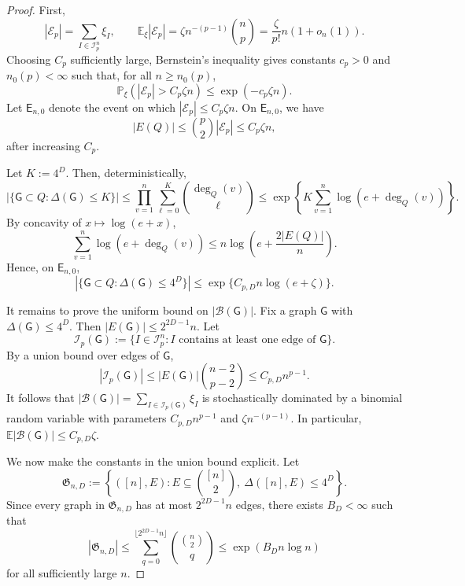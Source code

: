 \documentclass[12pt]{article}
\newcommand{\E}{\mathbb{E}}
\renewcommand{\P}{\mathbb{P}}
\newcommand{\mcB}{\mathcal{B}}
\newcommand{\mcE}{\mathcal{E}}
\newcommand{\mcI}{\mathcal{I}}
\begin{document}
\begin{proof}
First,
\[
    |\mcE_p|=\sum_{I\in\mcI_p^n}\xi_I,
    \qquad
    \E_\xi|\mcE_p|
    =
    \zeta n^{-(p-1)}\binom np
    =
    \frac{\zeta}{p!}n(1+o_n(1)).
\]
Choosing \(C_p\) sufficiently large, Bernstein's inequality gives
constants \(c_p>0\) and \(n_0(p)<\infty\) such that, for all
\(n\ge n_0(p)\),
\[
    \P_\xi\left(|\mcE_p|>C_p\zeta n\right)
    \le
    \exp(-c_p\zeta n).
\]
Let \(\mathsf E_{n,0}\) denote the event on which
\(|\mcE_p|\le C_p\zeta n\). On \(\mathsf E_{n,0}\), we have
\[
    |E(Q)|
    \le
    \binom p2|\mcE_p|
    \le
    C_p\zeta n,
\]
after increasing \(C_p\).

Let \(K:=4^D\). Then, deterministically,
\[
    |\{\mathsf G\subset Q:\Delta(\mathsf G)\le K\}|
    \le
    \prod_{v=1}^n
    \sum_{\ell=0}^K\binom{\deg_Q(v)}{\ell}
    \le
    \exp\left\{
        K\sum_{v=1}^n\log(e+\deg_Q(v))
    \right\}.
\]
By concavity of \(x\mapsto\log(e+x)\),
\[
    \sum_{v=1}^n\log(e+\deg_Q(v))
    \le
    n\log\left(
        e+\frac{2|E(Q)|}{n}
    \right).
\]
Hence, on \(\mathsf E_{n,0}\),
\[
    |\{\mathsf G\subset Q:\Delta(\mathsf G)\le4^D\}|
    \le
    \exp\{C_{p,D}n\log(e+\zeta)\}.
\]

It remains to prove the uniform bound on \(|\mcB(\mathsf G)|\). Fix a
graph \(\mathsf G\) with \(\Delta(\mathsf G)\le4^D\). Then $|E(\mathsf G)|
    \le
    2^{2D-1}n$. Let
\[
    \mcI_p(\mathsf G)
    :=
    \{I\in\mcI_p^n:
      I\text{ contains at least one edge of }\mathsf G\}.
\]
By a union bound over edges of \(\mathsf G\),
\[
    |\mcI_p(\mathsf G)|
    \le
    |E(\mathsf G)|\binom{n-2}{p-2}
    \le
    C_{p,D}n^{p-1}.
\]
It follows that $|\mcB(\mathsf G)|
    =
    \sum_{I\in\mcI_p(\mathsf G)}\xi_I$ is stochastically dominated by a binomial random variable with
parameters \(C_{p,D}n^{p-1}\) and
\(\zeta n^{-(p-1)}\). In particular, $\E|\mcB(\mathsf G)|
    \le
    C_{p,D}\zeta$.

We now make the constants in the union bound explicit. Let
\[
    \mathfrak G_{n,D}
    :=
    \left\{
        ([n],E):
        E\subseteq \binom{[n]}{2},
        \ \Delta([n],E)\le 4^D
    \right\}.
\]
Since every graph in \(\mathfrak G_{n,D}\) has at most
\(2^{2D-1}n\) edges, there exists \(B_D<\infty\) such that
\[
    |\mathfrak G_{n,D}|
    \le
    \sum_{q=0}^{\lfloor 2^{2D-1}n\rfloor}
    \binom{\binom n2}{q}
    \le
    \exp(B_Dn\log n)
\]
for all sufficiently large \(n\).


\end{proof}
\end{document}
